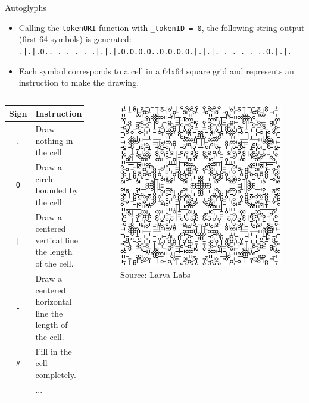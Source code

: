 \documentclass[handout]{beamer}
\begin{document}
\begin{frame}{Autoglyphs}
	\begin{itemize}
		\item Calling the \texttt{tokenURI} function with \texttt{\_tokenID = 0}, the following string output (first 64 symbols) is generated: {\scriptsize \texttt{.|.|.O..-.-.-.-.-.|.|.|.O.O.O.O..O.O.O.O.|.|.|.-.-.-.-.-..O.|.|.}}
		\item Each symbol corresponds to a cell in a 64x64 square grid and represents an instruction to make the drawing.
	\end{itemize}
	\begin{columns}
		\begin{table}
		\scriptsize
			\begin{tabular}{c|p{4.5cm}} 
			Sign & Instruction \\
			\hline
			\texttt{.} & Draw nothing in the cell\\
			\texttt{O} & Draw a circle bounded by the cell \\
			\texttt{|} & Draw a centered vertical line the length of the cell.\\
			\texttt{-} & Draw a centered horizontal line the length of the cell.\\
			\texttt{\#} & Fill in the cell completely. \\
			{} & ... \\
			\end{tabular}
		\end{table}
			\begin{figure}
				\center
				\vspace{-0.5em}
				\includegraphics[scale=0.2]{../assets/images/glyph1.png}
				\caption*{Source: \link \href{https://larvalabs.com/autoglyphs/glyph?index=1}{Larva Labs}}	
			\end{figure}
	\end{columns}
\end{frame}
\end{document}
